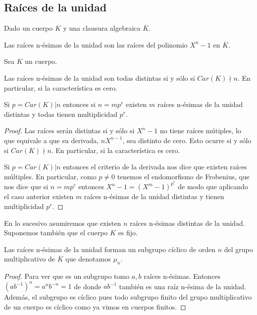 \subsection{Raíces de la unidad}

\begin{definition}
Dado un cuerpo $K$ y una clausura algebraica $\overline{K}$. 

Las raíces n-ésimas de la unidad son las raíces del polinomio $X^n-1$ en $\overline{K}$.
\end{definition}

\begin{proposition}
Sea $K$ un cuerpo. 

Las raíces n-ésimas de la unidad son todas distintas si y sólo si $Car(K) \nmid n$. En particular, si la característica es cero. 

Si $p = Car(K) | n$ entonces si $n = mp^r$ existen $m$ raíces n-ésimas de la unidad distintas y todas tienen multiplicidad $p^r$. 
\end{proposition}
\begin{proof}
Las raíces serán distintas si y sólo si $X^n - 1$ no tiene raíces mútiples, lo que equivale a que su derivada, $nX^{n-1}$, sea distinto de cero. Esto ocurre si y sólo si $Car(K) \nmid n$. En particular, si la característica es cero. 

Si $p = Car(K) | n$ entonces el criterio de la derivada nos dice que existen raíces múltiples. En particular, como $p \neq 0$ tenemos el endomorfismo de Frobenius, que nos dice que si $n = mp^r$ entonces $X^n - 1 = (X^m - 1)^{p^r}$ de modo que aplicando el caso anterior existen $m$ raíces n-ésimas de la unidad distintas y tienen multiplicidad $p^r$. 
\end{proof}

En lo sucesivo asumiremos que existen $n$ raíces n-ésimas distintas de la unidad. Suponemos también que el cuerpo $K$ es fijo. 

\begin{proposition}
Las raíces n-ésimas de la unidad forman un subgrupo cíclico de orden $n$ del grupo multiplicativo de $\overline{K}$ que denotamos $\mu_n$.
\end{proposition}
\begin{proof}
Para ver que es un subgrupo tomo $a,b$ raíces n-ésimas. Entonces $(ab^{-1})^n = a^nb^{-n} = 1$ de donde $ab^{-1}$ también es una raíz n-ésima de la unidad. Además, el subgrupo es cíclico pues todo subgrupo finito del grupo multiplicativo de un cuerpo es cíclico como ya vimos en cuerpos finitos. 
\end{proof}


